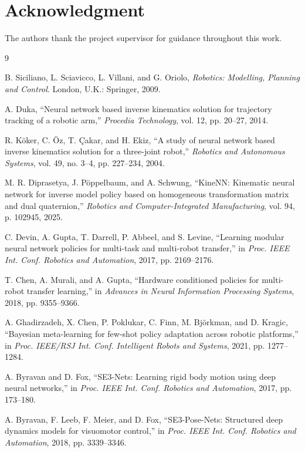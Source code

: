 \documentclass[conference]{IEEEtran}
\begin{document}
\section*{Acknowledgment}
The authors thank the project supervisor for guidance throughout this work.

\begin{thebibliography}{9}
\setlength{\itemsep}{2pt plus 1pt}

B. Siciliano, L. Sciavicco, L. Villani, and G. Oriolo, \emph{Robotics: Modelling, Planning and Control}. London, U.K.: Springer, 2009.

A. Duka, ``Neural network based inverse kinematics solution for trajectory tracking of a robotic arm,'' \emph{Procedia Technology}, vol. 12, pp. 20--27, 2014.

R. K{\"o}ker, C. {\"O}z, T. {\c{C}}akar, and H. Ekiz, ``A study of neural network based inverse kinematics solution for a three-joint robot,'' \emph{Robotics and Autonomous Systems}, vol. 49, no. 3--4, pp. 227--234, 2004.

M. R. Diprasetya, J. P{\"o}ppelbaum, and A. Schwung, ``KineNN: Kinematic neural network for inverse model policy based on homogeneous transformation matrix and dual quaternion,'' \emph{Robotics and Computer-Integrated Manufacturing}, vol. 94, p. 102945, 2025.

C. Devin, A. Gupta, T. Darrell, P. Abbeel, and S. Levine, ``Learning modular neural network policies for multi-task and multi-robot transfer,'' in \emph{Proc. IEEE Int. Conf. Robotics and Automation}, 2017, pp. 2169--2176.

T. Chen, A. Murali, and A. Gupta, ``Hardware conditioned policies for multi-robot transfer learning,'' in \emph{Advances in Neural Information Processing Systems}, 2018, pp. 9355--9366.

A. Ghadirzadeh, X. Chen, P. Poklukar, C. Finn, M. Bj{\"o}rkman, and D. Kragic, ``Bayesian meta-learning for few-shot policy adaptation across robotic platforms,'' in \emph{Proc. IEEE/RSJ Int. Conf. Intelligent Robots and Systems}, 2021, pp. 1277--1284.

A. Byravan and D. Fox, ``SE3-Nets: Learning rigid body motion using deep neural networks,'' in \emph{Proc. IEEE Int. Conf. Robotics and Automation}, 2017, pp. 173--180.

A. Byravan, F. Leeb, F. Meier, and D. Fox, ``SE3-Pose-Nets: Structured deep dynamics models for visuomotor control,'' in \emph{Proc. IEEE Int. Conf. Robotics and Automation}, 2018, pp. 3339--3346.

\end{thebibliography}
\end{document}
